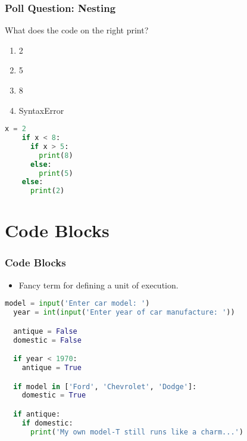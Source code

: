 \documentclass{beamer}
\begin{document}
%
%
\begin{frame}[fragile]
  \frametitle{Poll Question: Nesting}
  What does the code on the right print?
  \vfill
  \begin{minipage}{0.49\textwidth}
    \begin{enumerate}[A]
      \item 2
      \item 5
      \item 8
      \item SyntaxError
    \end{enumerate}
  \end{minipage}
  \begin{minipage}{0.49\textwidth}
    \begin{lstlisting}[language=Python, autogobble]
    x = 2
    if x < 8:
      if x > 5:
        print(8)
      else:
        print(5)
    else:
      print(2)
    \end{lstlisting}
  \end{minipage}
\end{frame}

%
%
\section{Code Blocks}
\begin{frame}[fragile]
  \frametitle{Code Blocks}

  \begin{itemize}
    \item Fancy term for defining a unit of execution.
  \end{itemize}
  \begin{lstlisting}[language=Python, autogobble]
  model = input('Enter car model: ')
  year = int(input('Enter year of car manufacture: '))

  antique = False
  domestic = False

  if year < 1970:
    antique = True

  if model in ['Ford', 'Chevrolet', 'Dodge']:
    domestic = True

  if antique:
    if domestic:
      print('My own model-T still runs like a charm...')
  \end{lstlisting}
\end{frame}

%
%
\end{document}
